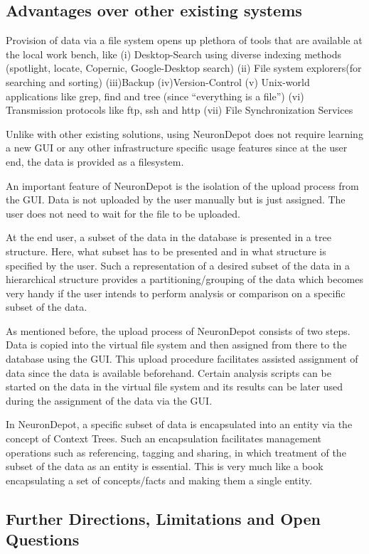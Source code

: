 \documentclass{frontiersSCNS} %
\begin{document}
\subsection{Advantages over other existing systems}
Provision of data via a file system opens up plethora of tools that are
available at the local work bench, like (i) Desktop-Search using diverse
indexing methods (spotlight, locate, Copernic, Google-Desktop search) (ii) File
system explorers(for  searching and sorting) (iii)Backup (iv)Version-Control
(v) Unix-world applications like grep, find and tree (since “everything is a
file”) (vi) Transmission protocols like ftp, ssh and http (vii) File
Synchronization Services

Unlike with other existing solutions, using NeuronDepot does not require
learning a new GUI or any other infrastructure specific usage features since at
the user end, the data is provided as  a filesystem.

An important feature of NeuronDepot is the isolation of the upload process from
the GUI. Data is not uploaded by the user manually but is just assigned. The
user does not need to wait for the file to be uploaded.

At the end user, a subset of the data in the database is presented in a tree
structure. Here, what subset has to be presented and in what structure is
specified by the user. Such a representation of a desired subset of the data in
a hierarchical structure provides a partitioning/grouping of the data which
becomes very handy if the user intends to perform analysis or comparison on a
specific subset of the data.

As mentioned before, the upload process of NeuronDepot consists of two steps.
Data is copied into the virtual file system and then assigned from there to the
database using the GUI. This upload procedure facilitates assisted assignment
of data since the data is available beforehand. Certain analysis scripts can be
started on the data in the virtual file system and its results can be later
used during the assignment of the data via the GUI.

In NeuronDepot, a specific subset of data is encapsulated into an entity via
the concept of Context Trees. Such an encapsulation facilitates management
operations such as referencing, tagging and sharing, in which treatment of the
subset of the data as an entity is essential. This is very much like a book
encapsulating a set of concepts/facts and making them a single entity.

\subsection{Further Directions, Limitations and Open Questions}
\end{document}
